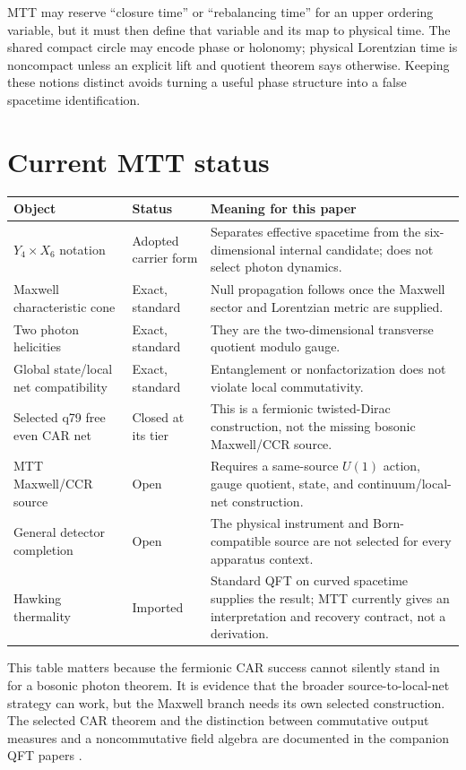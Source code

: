 \documentclass[11pt,a4paper]{article}
\numberwithin{equation}{section}
\theoremstyle{definition}
\theoremstyle{remark}
\begin{document}
MTT may reserve ``closure time'' or ``rebalancing time'' for an upper
ordering variable, but it must then define that variable and its map to
physical time.  The shared compact circle may encode phase or holonomy;
physical Lorentzian time is noncompact unless an explicit lift and
quotient theorem says otherwise.  Keeping these notions distinct avoids
turning a useful phase structure into a false spacetime identification.

\section{Current MTT status}

\begin{center}
\begin{tabular}{@{}p{}p{}p{}@{}}
\toprule
Object & Status & Meaning for this paper\\
\midrule
\(Y_4\times X_6\) notation & Adopted carrier form &
Separates effective spacetime from the six-dimensional internal
candidate; does not select photon dynamics.\\
Maxwell characteristic cone & Exact, standard &
Null propagation follows once the Maxwell sector and Lorentzian metric
are supplied.\\
Two photon helicities & Exact, standard &
They are the two-dimensional transverse quotient modulo gauge.\\
Global state/local net compatibility & Exact, standard &
Entanglement or nonfactorization does not violate local commutativity.\\
Selected q79 free even CAR net & Closed at its tier &
This is a fermionic twisted-Dirac construction, not the missing bosonic
Maxwell/CCR source.\\
MTT Maxwell/CCR source & Open &
Requires a same-source \(U(1)\) action, gauge quotient, state, and
continuum/local-net construction.\\
General detector completion & Open &
The physical instrument and Born-compatible source are not selected for
every apparatus context.\\
Hawking thermality & Imported &
Standard QFT on curved spacetime supplies the result; MTT currently gives
an interpretation and recovery contract, not a derivation.\\
\bottomrule
\end{tabular}
\end{center}

This table matters because the fermionic CAR success cannot silently
stand in for a bosonic photon theorem.  It is evidence that the broader
source-to-local-net strategy can work, but the Maxwell branch needs its
own selected construction.  The selected CAR theorem and the distinction
between commutative output measures and a noncommutative field algebra
are documented in the companion QFT papers
\cite{NeroQFT2026,NeroQFTInterface2026}.
\end{document}
